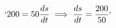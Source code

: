 \documentclass[preview]{standalone}
\begin{document}
\begin{align*}
`200 = 50 \frac{ds}{dt} \implies \frac{ds}{dt} = \frac{200}{50}`
\end{align*}
\end{document}
